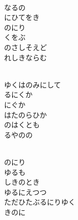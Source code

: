 \documentclass[10pt,b5j]{tarticle} %
\begin{document}
\vspace{1.5em} %
\newcommand{\linespace}{0.5em} %
\newcommand{\blocksize}{0.5\hsize} %
\newcommand{\itemmargin}{3em} %
\begin{enumerate} %
    \setlength{\itemindent}{\itemmargin} %
    \begin{minipage}[c]{\blocksize}
    
        \vspace{\linespace}
        \item~\\
        なるの\\
        にひてをき\\
        のにり\\
        くをぶ\\
        のさしそえど\\
        れしきならむ
        
    \end{minipage}
    \begin{minipage}[c]{\blocksize}
        
        \vspace{\linespace}
        \item~\\
        ゆくはのみにして\\
        るにくか\\
        にぐか\\
        はたのらひか\\
        のはくとも\\
        るやのの
        
    \end{minipage}
    \begin{minipage}[c]{\blocksize}
        
        \vspace{\linespace}
        \item~\\
        のにり\\
        ゆるも\\
        しきのとき\\
        ゆるにえつつ\\
        ただひたぶるにりゆく\\
        きのに
        

\end{minipage}
\end{enumerate}
\end{document}
